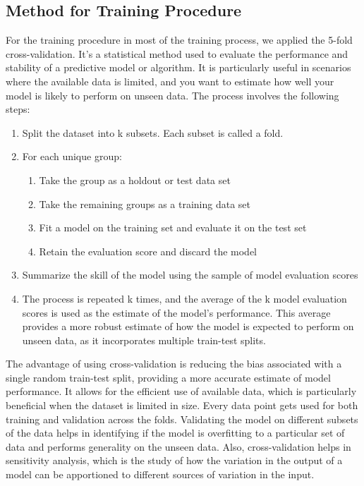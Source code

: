 \documentclass[12pt]{article}
\begin{document}
\subsection{Method for Training Procedure}
\quad For the training procedure in most of the training process, we applied the 5-fold cross-validation.
It's a statistical method used to evaluate the performance and stability of a predictive model or algorithm. 
It is particularly useful in scenarios where the available data is limited, and you want to estimate how well 
your model is likely to perform on unseen data. The process involves the following steps:
\begin{enumerate}
    \item Split the dataset into k subsets. Each subset is called a fold.
    \item For each unique group:
    \begin{enumerate}
        \item Take the group as a holdout or test data set
        \item Take the remaining groups as a training data set
        \item Fit a model on the training set and evaluate it on the test set
        \item Retain the evaluation score and discard the model
    \end{enumerate}
    \item Summarize the skill of the model using the sample of model evaluation scores
    \item The process is repeated k times, and the average of the k model evaluation scores is used as the estimate of the model's performance. 
    This average provides a more robust estimate of how the model is expected to perform on unseen data, as it incorporates multiple train-test splits.
\end{enumerate}

The advantage of using cross-validation is reducing the bias associated with a single random train-test split, providing a more accurate estimate of model performance.
It allows for the efficient use of available data, which is particularly beneficial when the dataset is limited in size. Every data point gets used for both training and validation across the folds.
Validating the model on different subsets of the data helps in identifying if the model is overfitting to a particular set of data and performs generality on the unseen data. Also, cross-validation helps in 
sensitivity analysis, which is the study of how the variation in the output of a model can be apportioned to different sources of variation in the input.
\end{document}
